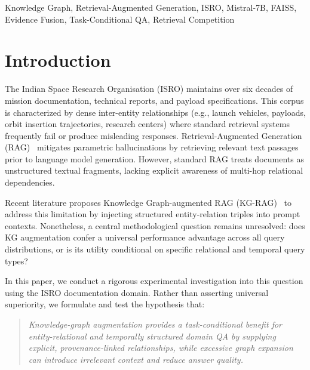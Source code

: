 \documentclass[conference]{IEEEtran}
\begin{document}
\begin{IEEEkeywords}
Knowledge Graph, Retrieval-Augmented Generation, ISRO, Mistral-7B, FAISS, Evidence Fusion, Task-Conditional QA, Retrieval Competition
\end{IEEEkeywords}

\section{Introduction}
\label{sec:intro}

The Indian Space Research Organisation (ISRO) maintains over six decades of mission documentation, technical reports, and payload specifications. This corpus is characterized by dense inter-entity relationships (e.g., launch vehicles, payloads, orbit insertion trajectories, research centers) where standard retrieval systems frequently fail or produce misleading responses. Retrieval-Augmented Generation (RAG)~\cite{lewis2020rag} mitigates parametric hallucinations by retrieving relevant text passages prior to language model generation. However, standard RAG treats documents as unstructured textual fragments, lacking explicit awareness of multi-hop relational dependencies.

Recent literature proposes Knowledge Graph-augmented RAG (KG-RAG)~\cite{he2024gretriever, ma2024tog2, zhang2025kg2rag} to address this limitation by injecting structured entity-relation triples into prompt contexts. Nonetheless, a central methodological question remains unresolved: does KG augmentation confer a universal performance advantage across all query distributions, or is its utility conditional on specific relational and temporal query types?

In this paper, we conduct a rigorous experimental investigation into this question using the ISRO documentation domain. Rather than asserting universal superiority, we formulate and test the hypothesis that:
\begin{quote}
\textit{Knowledge-graph augmentation provides a task-conditional benefit for entity-relational and temporally structured domain QA by supplying explicit, provenance-linked relationships, while excessive graph expansion can introduce irrelevant context and reduce answer quality.}
\end{quote}
\end{document}
